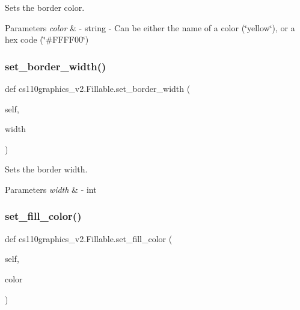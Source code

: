 Sets the border color. 


\begin{DoxyParams}{Parameters}
{\em color} & -\/ string -\/ Can be either the name of a color (\char`\"{}yellow\char`\"{}), or a hex code (\char`\"{}\#\+F\+F\+F\+F00\char`\"{}) \\
\hline
\end{DoxyParams}
\mbox{\label{classcs110graphics__v2_1_1Fillable_a6576e9d1634853c8784107d505b50c15}} 
\subsubsection{\texorpdfstring{set\_border\_width()}{set\_border\_width()}}
{\footnotesize\ttfamily def cs110graphics\+\_\+v2.\+Fillable.\+set\+\_\+border\+\_\+width (\begin{DoxyParamCaption}\item[{}]{self,  }\item[{}]{width }\end{DoxyParamCaption})}



Sets the border width. 


\begin{DoxyParams}{Parameters}
{\em width} & -\/ int \\
\hline
\end{DoxyParams}
\mbox{\label{classcs110graphics__v2_1_1Fillable_aa3bc1ae6a16af93e845af7174f67946d}} 
\subsubsection{\texorpdfstring{set\_fill\_color()}{set\_fill\_color()}}
{\footnotesize\ttfamily def cs110graphics\+\_\+v2.\+Fillable.\+set\+\_\+fill\+\_\+color (\begin{DoxyParamCaption}\item[{}]{self,  }\item[{}]{color }\end{DoxyParamCaption})}



